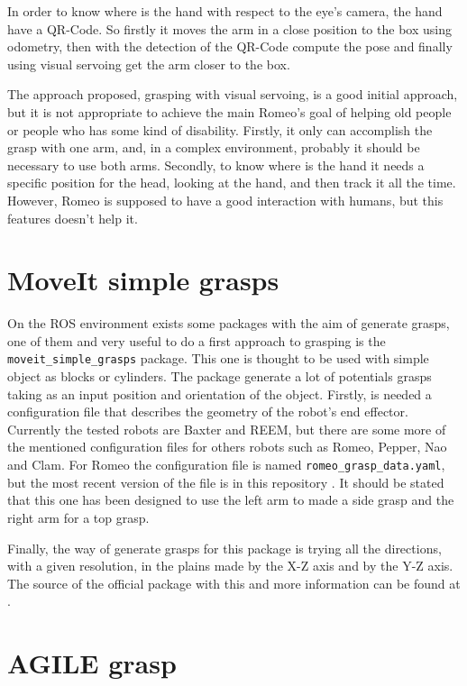 \documentclass[12pt,a4paper,final,twoside,openright]{report}
\begin{document}
In order to know where is the hand with respect to the eye's camera, the hand have a QR-Code. So firstly it moves the arm in a close position to the box using odometry, then with the detection of the QR-Code compute the pose and finally using visual servoing get the arm closer to the box.

The approach proposed, grasping with visual servoing, is a good initial approach, but it is not appropriate to achieve the main Romeo's goal of helping old people or people who has some kind of disability. Firstly, it only can accomplish the grasp with one arm, and, in a complex environment, probably it should be necessary to use both arms. Secondly, to know where is the hand it needs a specific position for the head, looking at the hand, and then track it all the time. However, Romeo is supposed to have a good interaction with humans, but this features doesn't help it.

\section{MoveIt simple grasps}
\label{sec:moveit_simple_grasps}

On the ROS environment exists some packages with the aim of generate grasps, one of them and very useful to do a first approach to grasping is the \texttt{moveit\_simple\_grasps} package. This one is thought to be used with simple object as blocks or cylinders. The package generate a lot of potentials grasps taking as an input position and orientation of the object. Firstly, is needed a configuration file that describes the geometry of the robot's end effector. Currently the tested robots are Baxter and REEM, but there are some more of the mentioned configuration files for others robots such as Romeo, Pepper, Nao and Clam. For Romeo the configuration file is named \texttt{romeo\_grasp\_data.yaml}, but the most recent version of the file is in this repository \cite{gitNlyubovaGrasp}. It should be stated that this one has been designed to use the left arm to made a side grasp and the right arm for a top grasp.

Finally, the way of generate grasps for this package is trying all the directions, with a given resolution, in the plains made by the X-Z axis and by the Y-Z axis. The source of the official package with this and more information can be found at \cite{gitMoveitSimpleGrasp}.


\section{AGILE grasp}
\label{sec:agile grasp}
\end{document}
